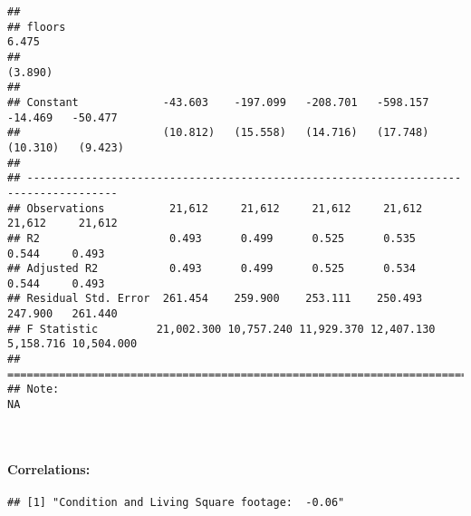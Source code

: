\documentclass[
]{article}
\newenvironment{Shaded}{\begin{snugshade}}{\end{snugshade}}
\newcommand{\CommentTok}[1]{\textcolor[rgb]{0.56,0.35,0.01}{\textit{#1}}}
\newcommand{\DataTypeTok}[1]{\textcolor[rgb]{0.13,0.29,0.53}{#1}}
\newcommand{\DecValTok}[1]{\textcolor[rgb]{0.00,0.00,0.81}{#1}}
\newcommand{\KeywordTok}[1]{\textcolor[rgb]{0.13,0.29,0.53}{\textbf{#1}}}
\newcommand{\NormalTok}[1]{#1}
\newcommand{\OperatorTok}[1]{\textcolor[rgb]{0.81,0.36,0.00}{\textbf{#1}}}
\newcommand{\StringTok}[1]{\textcolor[rgb]{0.31,0.60,0.02}{#1}}
\begin{document}
\begin{verbatim}
##                                                                                     
## floors                                                                      6.475   
##                                                                            (3.890)  
##                                                                                     
## Constant             -43.603    -197.099   -208.701   -598.157   -14.469   -50.477  
##                      (10.812)   (15.558)   (14.716)   (17.748)  (10.310)   (9.423)  
##                                                                                     
## ------------------------------------------------------------------------------------
## Observations          21,612     21,612     21,612     21,612    21,612     21,612  
## R2                    0.493      0.499      0.525      0.535      0.544     0.493   
## Adjusted R2           0.493      0.499      0.525      0.534      0.544     0.493   
## Residual Std. Error  261.454    259.900    253.111    250.493    247.900   261.440  
## F Statistic         21,002.300 10,757.240 11,929.370 12,407.130 5,158.716 10,504.000
## ====================================================================================
## Note:                                                                             NA
\end{verbatim}

~

\hypertarget{correlations-1}{%
\paragraph{Correlations:}\label{correlations-1}}

\begin{Shaded}
\end{Shaded}

\begin{verbatim}
## [1] "Condition and Living Square footage:  -0.06"
\end{verbatim}

\begin{Shaded}
\end{Shaded}
\end{document}
